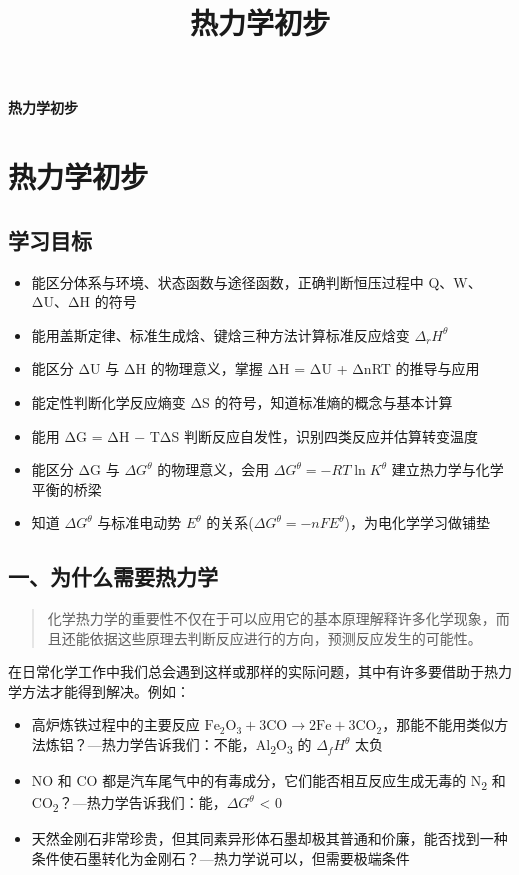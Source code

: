 \documentclass[a4paper,11pt]{ctexart}
\title{热力学初步}
\date{}
\providecommand{\tightlist}{\setlength{\itemsep}{0pt}\setlength{\parskip}{0pt}}
\newcommand{\箭}{\ensuremath{\rightarrow}}
\newcommand{\左箭}{\ensuremath{\leftarrow}}
\newcommand{\上箭}{\ensuremath{\uparrow}}
\newcommand{\下箭}{\ensuremath{\downarrow}}
\newcommand{\衡}{\ensuremath{\rightleftharpoons}}
\newcommand{\双箭}{\ensuremath{\leftrightarrow}}
\newcommand{\约等于}{\ensuremath{\approx}}
\newcommand{\小于等于}{\ensuremath{\leq}}
\newcommand{\大于等于}{\ensuremath{\geq}}
\newcommand{\不等于}{\ensuremath{\neq}}
\newcommand{\西格马}{\ensuremath{\sigma}}
\newcommand{\派}{\ensuremath{\pi}}
\begin{document}
\thispagestyle{plain}
\begin{center}
{\bfseries 热力学初步\par}
\end{center}
\vspace{1em}
\section{热力学初步}\label{ux70edux529bux5b66ux521dux6b65}

\subsection{学习目标}\label{ux5b66ux4e60ux76eeux6807}

\begin{itemize}
\tightlist
\item
  能区分体系与环境、状态函数与途径函数，正确判断恒压过程中 Q、W、ΔU、ΔH 的符号
\item
  能用盖斯定律、标准生成焓、键焓三种方法计算标准反应焓变 \(\Delta_r H^\theta\)
\item
  能区分 ΔU 与 ΔH 的物理意义，掌握 ΔH = ΔU + ΔnRT 的推导与应用
\item
  能定性判断化学反应熵变 ΔS 的符号，知道标准熵的概念与基本计算
\item
  能用 ΔG = ΔH − TΔS 判断反应自发性，识别四类反应并估算转变温度
\item
  能区分 ΔG 与 \(\Delta G^\theta\) 的物理意义，会用 \(\Delta G^\theta = -RT \ln K^\theta\) 建立热力学与化学平衡的桥梁
\item
  知道 \(\Delta G^\theta\) 与标准电动势 \(E^\theta\) 的关系(\(\Delta G^\theta = -nFE^\theta\))，为电化学学习做铺垫
\end{itemize}

\subsection{一、为什么需要热力学}\label{ux4e00ux4e3aux4ec0ux4e48ux9700ux8981ux70edux529bux5b66}

\begin{quote}
化学热力学的重要性不仅在于可以应用它的基本原理解释许多化学现象，而且还能依据这些原理去判断反应进行的方向，预测反应发生的可能性。
\end{quote}

在日常化学工作中我们总会遇到这样或那样的实际问题，其中有许多要借助于热力学方法才能得到解决。例如：

\begin{itemize}
\tightlist
\item
  高炉炼铁过程中的主要反应 \(\mathrm{Fe_2O_3 + 3CO \to 2Fe + 3CO_2}\)，那能不能用类似方法炼铝？---热力学告诉我们：不能，Al\textsubscript{2}O\textsubscript{3} 的 \(\Delta_f H^\theta\) 太负
\item
  NO 和 CO 都是汽车尾气中的有毒成分，它们能否相互反应生成无毒的 N\textsubscript{2} 和 CO\textsubscript{2}？---热力学告诉我们：能，\(\Delta G^\theta\) \textless{} 0
\item
  天然金刚石非常珍贵，但其同素异形体石墨却极其普通和价廉，能否找到一种条件使石墨转化为金刚石？---热力学说可以，但需要极端条件
\end{itemize}
\end{document}
